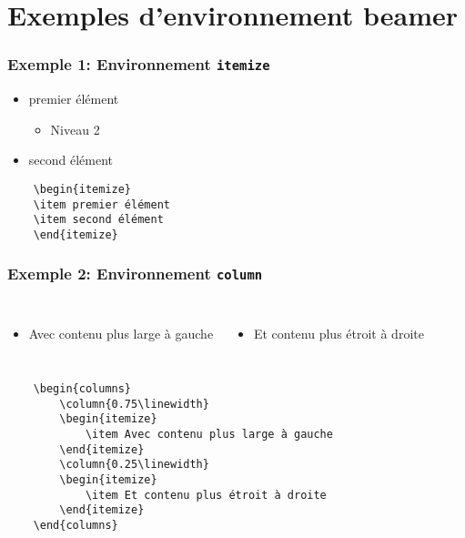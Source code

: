 \documentclass[aspectratio=169]{beamer}
\begin{document}
\section{Exemples d'environnement beamer}

\begin{frame}[fragile]
    \frametitle{Exemple 1: Environnement \texttt{itemize}}
\begin{itemize}
    \item premier élément 
        \begin{itemize}
            \item Niveau 2
        \end{itemize}
    \item second élément
\end{itemize}
\begin{verbatim}
    \begin{itemize}
    \item premier élément 
    \item second élément
    \end{itemize}
\end{verbatim}
\end{frame}

\begin{frame}[fragile]
    \frametitle{Exemple 2: Environnement \texttt{column}}
    \begin{columns}
        \begin{itemize}
            \item Avec contenu plus large à gauche
        \end{itemize}
        \begin{itemize}
            \item Et contenu plus étroit à droite 
        \end{itemize}
    \end{columns}
{\scriptsize
\begin{verbatim}
    \begin{columns}
        \column{0.75\linewidth}
        \begin{itemize}
            \item Avec contenu plus large à gauche
        \end{itemize}
        \column{0.25\linewidth}
        \begin{itemize}
            \item Et contenu plus étroit à droite 
        \end{itemize}
    \end{columns}
\end{verbatim}
}
\end{frame}
\end{document}
